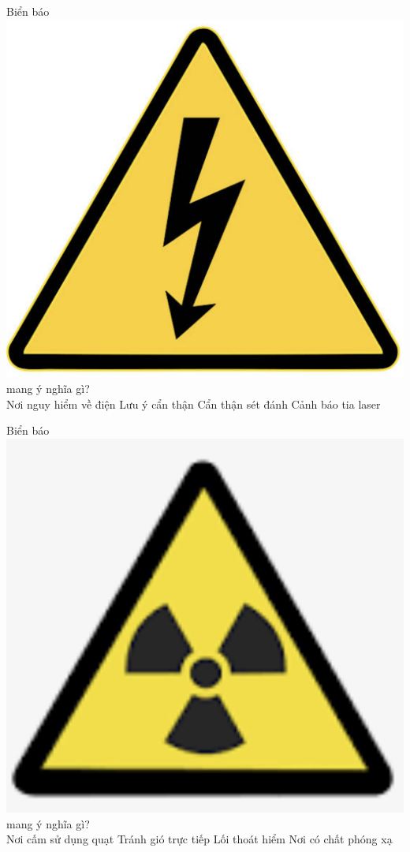 \begin{ex}
	Biển báo \vspace{-0.5cm}\includegraphics[scale=0.1]{figs/G10Y25B1-5} mang ý nghĩa gì?\\
	\choice
	{\True Nơi nguy hiểm về điện}
	{Lưu ý cẩn thận}
	{Cẩn thận sét đánh}
	{Cảnh báo tia laser}
	\loigiai{}
\end{ex}

\begin{ex}
	Biển báo \vspace{-0.5cm}\includegraphics[scale=0.2]{figs/G10Y25B1-6} mang ý nghĩa gì?\\
	\choice
	{Nơi cấm sử dụng quạt}
	{Tránh gió trực tiếp}
	{Lối thoát hiểm}
	{\True Nơi có chất phóng xạ}
	\loigiai{}
\end{ex}

